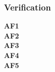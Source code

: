\documentclass{article}
\begin{document}
\subsubsection{Verification}
\textbf{AF1} \mbox{} \\
\textbf{AF2} \mbox{} \\
\textbf{AF3} \mbox{} \\
\textbf{AF4} \mbox{} \\
\textbf{AF5} \mbox{} \\

\end{document}
